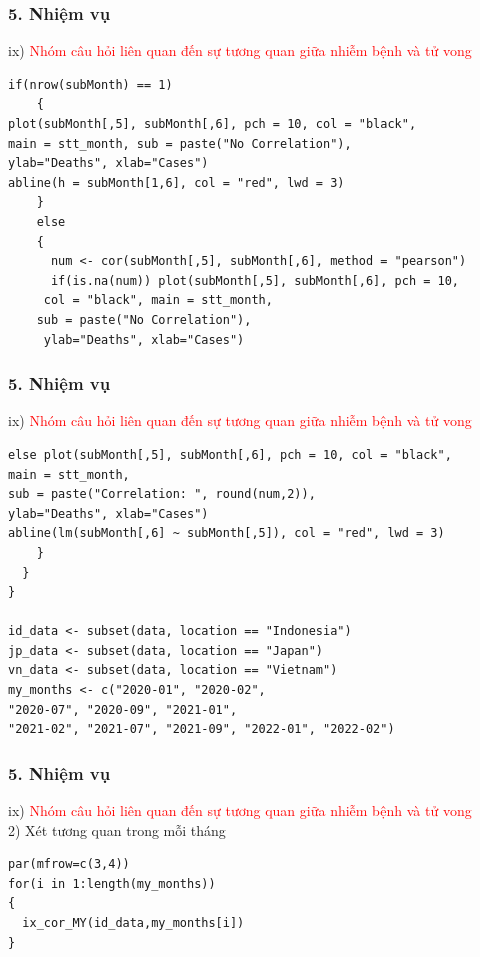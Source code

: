 \documentclass[english,10pt,table]{beamer}
\begin{document}
\begin{frame}[fragile]
\frametitle{5.  Nhiệm vụ}
ix) \textcolor{red}{Nhóm câu hỏi liên quan đến sự tương quan giữa nhiễm bệnh và tử vong}\\
\lstset{title = Function and Prep for ix 2-3}
\begin{lstlisting}[frame=single,basicstyle=\tiny]  
    if(nrow(subMonth) == 1)
    {
plot(subMonth[,5], subMonth[,6], pch = 10, col = "black", 
main = stt_month, sub = paste("No Correlation"), 
ylab="Deaths", xlab="Cases")
abline(h = subMonth[1,6], col = "red", lwd = 3)
    }
    else 
    {
      num <- cor(subMonth[,5], subMonth[,6], method = "pearson")
      if(is.na(num)) plot(subMonth[,5], subMonth[,6], pch = 10, 
     col = "black", main = stt_month, 
    sub = paste("No Correlation"), 
     ylab="Deaths", xlab="Cases")
\end{lstlisting}
\end{frame}

\begin{frame}[fragile]
\frametitle{5.  Nhiệm vụ}
ix) \textcolor{red}{Nhóm câu hỏi liên quan đến sự tương quan giữa nhiễm bệnh và tử vong}\\
        \lstset{
    title=Function and Prep for ix 2-3}
\begin{lstlisting}[frame=single,basicstyle=\tiny]  
else plot(subMonth[,5], subMonth[,6], pch = 10, col = "black", 
main = stt_month, 
sub = paste("Correlation: ", round(num,2)), 
ylab="Deaths", xlab="Cases")
abline(lm(subMonth[,6] ~ subMonth[,5]), col = "red", lwd = 3)
    }
  }
}

id_data <- subset(data, location == "Indonesia")
jp_data <- subset(data, location == "Japan")
vn_data <- subset(data, location == "Vietnam")
my_months <- c("2020-01", "2020-02", 
"2020-07", "2020-09", "2021-01",
"2021-02", "2021-07", "2021-09", "2022-01", "2022-02")
\end{lstlisting}
\end{frame}

\begin{frame}[fragile]
\frametitle{5.  Nhiệm vụ}
ix) \textcolor{red}{Nhóm câu hỏi liên quan đến sự tương quan giữa nhiễm bệnh và tử vong}\\
          2) Xét tương quan trong mỗi tháng
        \lstset{
    title=Source code for Indonesia}
\begin{lstlisting}[frame=single]  
par(mfrow=c(3,4))
for(i in 1:length(my_months))
{
  ix_cor_MY(id_data,my_months[i])
}
\end{lstlisting}
\end{frame}
\end{document}
